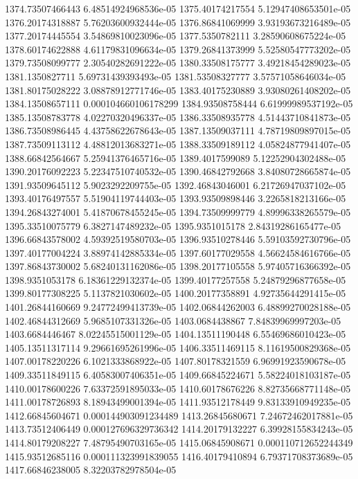 {1374.73507466443 6.48514924968536e-05
1375.40174217554 5.12947408653501e-05
1376.20174318887 5.76203600932444e-05
1376.86841069999 3.93193673216489e-05
1377.20174445554 3.54869810023096e-05
1377.5350782111 3.28590608675224e-05
1378.60174622888 4.61179831096634e-05
1379.26841373999 5.52580547773202e-05
1379.73508099777 2.30540282691222e-05
1380.33508175777 3.49218454289023e-05
1381.1350827711 5.69731439393493e-05
1381.53508327777 3.57571058646034e-05
1381.80175028222 3.08878912771746e-05
1383.40175230889 3.93080261408202e-05
1384.13508657111 0.000104660106178299
1384.93508758444 6.61999989537192e-05
1385.13508783778 4.02270320496337e-05
1386.33508935778 4.51443710841873e-05
1386.73508986445 4.43758622678643e-05
1387.13509037111 4.78719809897015e-05
1387.73509113112 4.48812013683271e-05
1388.33509189112 4.05824877941407e-05
1388.66842564667 5.25941376465716e-05
1389.4017599089 5.12252904302488e-05
1390.20176092223 5.22347510740532e-05
1390.46842792668 3.84080728665874e-05
1391.93509645112 5.9023292209755e-05
1392.46843046001 6.21726947037102e-05
1393.40176497557 5.51904119744403e-05
1393.93509898446 3.2265818213166e-05
1394.26843274001 5.41870678455245e-05
1394.73509999779 4.89996338265579e-05
1395.33510075779 6.3827147489232e-05
1395.9351015178 2.84319286165477e-05
1396.66843578002 4.59392519580703e-05
1396.93510278446 5.59103592730796e-05
1397.40177004224 3.88974142885334e-05
1397.60177029558 4.56624584616766e-05
1397.86843730002 5.68240131162086e-05
1398.20177105558 5.97405716366392e-05
1398.9351053178 6.18361229132374e-05
1399.40177257558 5.24879296877658e-05
1399.80177308225 5.1137821030602e-05
1400.20177358891 4.92735644291415e-05
1401.26844160669 9.24772499413739e-05
1402.06844262003 6.48899270028188e-05
1402.46844312669 5.9685107331326e-05
1403.0684438867 7.84839969997203e-05
1403.6684446467 8.02245515001129e-05
1404.13511190448 6.55469686010423e-05
1405.13511317114 9.29661695261996e-05
1406.33511469115 8.11619500829368e-05
1407.00178220226 6.1021333868922e-05
1407.80178321559 6.96991923590678e-05
1409.33511849115 6.40583007406351e-05
1409.66845224671 5.58224018103187e-05
1410.00178600226 7.63372591895033e-05
1410.60178676226 8.82735668771148e-05
1411.00178726893 8.18943499001394e-05
1411.93512178449 9.83133910949235e-05
1412.66845604671 0.000144903091234489
1413.26845680671 7.24672462017881e-05
1413.73512406449 0.000127696329736342
1414.20179132227 6.39928155834243e-05
1414.80179208227 7.48795490703165e-05
1415.06845908671 0.000110712652244349
1415.93512685116 0.000111323991839055
1416.40179410894 6.79371708373689e-05
1417.66846238005 8.32203782978504e-05
}
